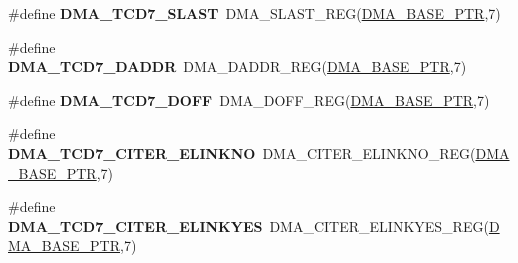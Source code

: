 \begin{DoxyCompactItemize}
\item 
\hypertarget{group___d_m_a___register___accessor___macros_ga5c071968c6d2421889098ea4f55c68e0}{}\#define {\bfseries D\+M\+A\+\_\+\+T\+C\+D7\+\_\+\+S\+L\+A\+S\+T}~D\+M\+A\+\_\+\+S\+L\+A\+S\+T\+\_\+\+R\+E\+G(\hyperlink{group___d_m_a___peripheral_ga6997fbc1b1973e9f27170217a3bd6f22}{D\+M\+A\+\_\+\+B\+A\+S\+E\+\_\+\+P\+T\+R},7)\label{group___d_m_a___register___accessor___macros_ga5c071968c6d2421889098ea4f55c68e0}

\item 
\hypertarget{group___d_m_a___register___accessor___macros_ga1a521a7dfdbf6626ffcaaccaca1eed27}{}\#define {\bfseries D\+M\+A\+\_\+\+T\+C\+D7\+\_\+\+D\+A\+D\+D\+R}~D\+M\+A\+\_\+\+D\+A\+D\+D\+R\+\_\+\+R\+E\+G(\hyperlink{group___d_m_a___peripheral_ga6997fbc1b1973e9f27170217a3bd6f22}{D\+M\+A\+\_\+\+B\+A\+S\+E\+\_\+\+P\+T\+R},7)\label{group___d_m_a___register___accessor___macros_ga1a521a7dfdbf6626ffcaaccaca1eed27}

\item 
\hypertarget{group___d_m_a___register___accessor___macros_ga51be79805d416f10b5705f324a660b5c}{}\#define {\bfseries D\+M\+A\+\_\+\+T\+C\+D7\+\_\+\+D\+O\+F\+F}~D\+M\+A\+\_\+\+D\+O\+F\+F\+\_\+\+R\+E\+G(\hyperlink{group___d_m_a___peripheral_ga6997fbc1b1973e9f27170217a3bd6f22}{D\+M\+A\+\_\+\+B\+A\+S\+E\+\_\+\+P\+T\+R},7)\label{group___d_m_a___register___accessor___macros_ga51be79805d416f10b5705f324a660b5c}

\item 
\hypertarget{group___d_m_a___register___accessor___macros_ga031018c1c2650eee7cf7606861bf9fba}{}\#define {\bfseries D\+M\+A\+\_\+\+T\+C\+D7\+\_\+\+C\+I\+T\+E\+R\+\_\+\+E\+L\+I\+N\+K\+N\+O}~D\+M\+A\+\_\+\+C\+I\+T\+E\+R\+\_\+\+E\+L\+I\+N\+K\+N\+O\+\_\+\+R\+E\+G(\hyperlink{group___d_m_a___peripheral_ga6997fbc1b1973e9f27170217a3bd6f22}{D\+M\+A\+\_\+\+B\+A\+S\+E\+\_\+\+P\+T\+R},7)\label{group___d_m_a___register___accessor___macros_ga031018c1c2650eee7cf7606861bf9fba}

\item 
\hypertarget{group___d_m_a___register___accessor___macros_ga7595d3fc88edbc275e9f21568d55e382}{}\#define {\bfseries D\+M\+A\+\_\+\+T\+C\+D7\+\_\+\+C\+I\+T\+E\+R\+\_\+\+E\+L\+I\+N\+K\+Y\+E\+S}~D\+M\+A\+\_\+\+C\+I\+T\+E\+R\+\_\+\+E\+L\+I\+N\+K\+Y\+E\+S\+\_\+\+R\+E\+G(\hyperlink{group___d_m_a___peripheral_ga6997fbc1b1973e9f27170217a3bd6f22}{D\+M\+A\+\_\+\+B\+A\+S\+E\+\_\+\+P\+T\+R},7)\label{group___d_m_a___register___accessor___macros_ga7595d3fc88edbc275e9f21568d55e382}


\end{DoxyCompactItemize}
